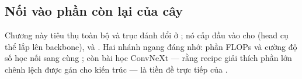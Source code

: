 \documentclass[../../deep_learning.tex]{subfiles}
\begin{document}
\subsection*{Nối vào phần còn lại của cây}
Chương này tiêu thụ toàn bộ  và trục đánh đổi ở ; nó cấp đầu vào cho  (head cụ thể lắp lên backbone),  và . Hai nhánh ngang đáng nhớ: phần FLOPs và cường độ số học nối sang  cùng ; còn bài học ConvNeXt --- rằng recipe giải thích phần lớn chênh lệch được gán cho kiến trúc --- là tiền đề trực tiếp của .
\end{document}

